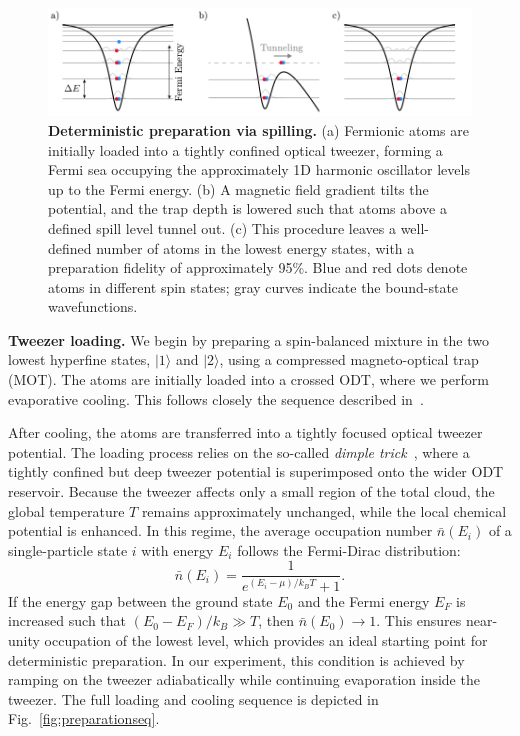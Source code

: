 

\begin{figure}
    \centering
    \includegraphics{fig-ai/preparation.pdf}
    \caption{
        \textbf{Deterministic preparation via spilling.}
        (a) Fermionic atoms are initially loaded into a tightly confined optical tweezer, forming a Fermi sea occupying the approximately 1D harmonic oscillator levels up to the Fermi energy. 
        (b) A magnetic field gradient tilts the potential, and the trap depth is lowered such that atoms above a defined spill level tunnel out. 
        (c) This procedure leaves a well-defined number of atoms in the lowest energy states, with a preparation fidelity of approximately 95\%. 
        Blue and red dots denote atoms in different spin states; gray curves indicate the bound-state wavefunctions.
    }
    \label{fig:preparation}
\end{figure}



\textbf{Tweezer loading.} We begin by preparing a spin-balanced mixture in the two lowest hyperfine states, $|1\rangle$ and $|2\rangle$, using a compressed magneto-optical trap (MOT). The atoms are initially loaded into a crossed ODT, where we perform evaporative cooling. This follows closely the sequence described in~\cite{culemann_construction_2024}.

After cooling, the atoms are transferred into a tightly focused optical tweezer potential. The loading process relies on the so-called \emph{dimple trick}~\cite{zurn_few-fermion_2012}, where a tightly confined but deep tweezer potential is superimposed onto the wider ODT reservoir. Because the tweezer affects only a small region of the total cloud, the global temperature $T$ remains approximately unchanged, while the local chemical potential is enhanced. In this regime, the average occupation number $\bar{n}(E_i)$ of a single-particle state $i$ with energy $E_i$ follows the Fermi-Dirac distribution:
\begin{equation}
    \bar{n}(E_i) = \frac{1}{e^{(E_i - \mu)/k_B T} + 1}.
\end{equation}
If the energy gap between the ground state $E_0$ and the Fermi energy $E_F$ is increased such that $(E_0 - E_F) / k_B \gg T$, then $\bar{n}(E_0) \rightarrow 1$. This ensures near-unity occupation of the lowest level, which provides an ideal starting point for deterministic preparation. In our experiment, this condition is achieved by ramping on the tweezer adiabatically while continuing evaporation inside the tweezer. The full loading and cooling sequence is depicted in Fig.~\ref{fig:preparationseq}.

